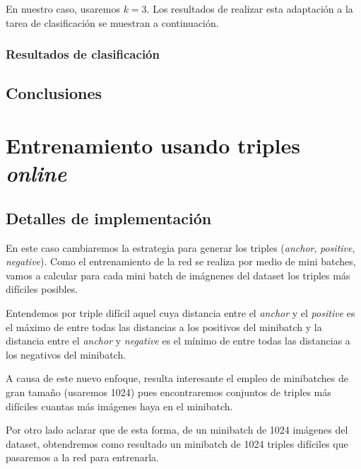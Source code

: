 \documentclass[11pt]{article}
\begin{document}
En nuestro caso, usaremos $k = 3$. Los resultados de realizar esta adaptación a la tarea de clasificación se muestran a continuación.

\subsubsection{Resultados de clasificación}



\subsection{Conclusiones} \label{conclusiones_triples_aleatorios:seccion}



\pagebreak

\section{Entrenamiento usando triples \emph{online}}

\subsection{Detalles de implementación}

En este caso cambiaremos la estrategia para generar los triples (\emph{anchor}, \emph{positive}, \emph{negative}). Como el entrenamiento de la red se realiza por medio de mini batches, vamos a calcular para cada mini batch de imágnenes del dataset los triples más difíciles posibles. 

Entendemos por triple difícil aquel cuya distancia entre el \emph{anchor} y el \emph{positive} es el máximo de entre todas las distancias a los positivos del minibatch y la distancia entre el \emph{anchor} y \emph{negative} es el mínimo de entre todas las distancias a los negativos del minibatch.

A causa de este nuevo enfoque, resulta interesante el empleo de minibatches de gran tamaño (usaremos 1024) pues encontraremos conjuntos de triples más difíciles cuantas más imágenes haya en el minibatch.

Por otro lado aclarar que de esta forma, de un minibatch de 1024 imágenes del dataset, obtendremos como resultado un minibatch de 1024 triples difíciles que pasaremos a la red para entrenarla.
\end{document}
